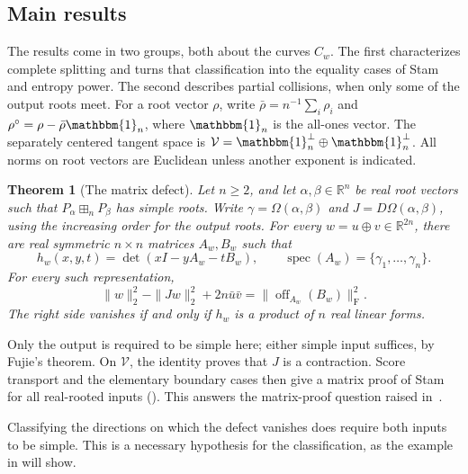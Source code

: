 \documentclass[12pt,reqno]{amsart}
\newtheorem{theorem}{Theorem}[section]
\theoremstyle{definition}
\theoremstyle{remark}
\newcommand{\R}{\mathbb R}
\newcommand{\one}{\mathbbm{1}_n}
\newcommand{\spec}{\operatorname{spec}}
\begin{document}
\subsection{Main results}
The results come in two groups, both about the curves \(C_w\).
The first characterizes complete splitting and turns that classification
into the equality cases of Stam and entropy power.  The second describes
partial collisions, when only some of the output roots meet.
For a root vector \(\rho\), write
\(\bar\rho=n^{-1}\sum_i\rho_i\) and
\(\rho^\circ=\rho-\bar\rho\one\), where
\(\one\) is the all-ones vector.  The separately centered tangent space
is \(\mathcal V=\one^\perp\oplus\one^\perp\).  All norms on root
vectors are Euclidean unless another exponent is indicated.

\begin{theorem}[The matrix defect]\label{thm:intro-matrix-defect}
Let \(n\geq2\), and let \(\alpha,\beta\in\R^n\) be real root vectors such that
\(P_\alpha\boxplus_nP_\beta\) has simple roots.  Write
\(\gamma=\Omega(\alpha,\beta)\) and \(J=D\Omega(\alpha,\beta)\),
using the increasing order for the output roots.
For every \(w=u\oplus v\in\R^{2n}\), there are real symmetric
\(n\times n\) matrices \(A_w,B_w\) such that
\begin{equation}\label{eq:intro-definite-pencil}
 h_w(x,y,t)=\det(xI-yA_w-tB_w),
 \qquad \spec(A_w)=\{\gamma_1,\ldots,\gamma_n\}.
\end{equation}
For every such representation,
\begin{equation}\label{eq:intro-matrix-defect}
 \|w\|_2^2-\|Jw\|_2^2+2n\bar u\bar v
       =\|\operatorname{off}_{A_w}(B_w)\|_{\mathrm F}^2.
\end{equation}
The right side vanishes if and only if \(h_w\) is a product of \(n\)
real linear forms.
\end{theorem}

Only the output is required to be simple here; either simple input
suffices, by Fujie's theorem.  On \(\mathcal V\), the identity proves
that \(J\) is a contraction.  Score transport and the elementary
boundary cases then give a matrix proof of Stam for all real-rooted
inputs ().  This answers the matrix-proof question
raised in~\cite[\S5, footnote~2]{GVS26}.

Classifying the directions on which the defect vanishes does require
both inputs to be simple.  This is a necessary hypothesis for the
classification, as the example in 
will show.
\end{document}
